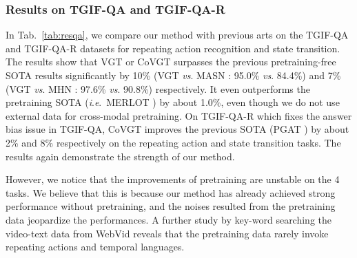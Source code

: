 \documentclass[10pt,journal,compsoc]{IEEEtran}
\newcommand{\vs}{\textit{vs}. }
\newcommand{\ie}{\textit{i}.\textit{e}.}
\begin{document}
\subsubsection{Results on TGIF-QA and TGIF-QA-R}
In Tab.~\ref{tab:resqa}, we compare our method with previous arts on the TGIF-QA \cite{jang2017tgif} and TGIF-QA-R \cite{peng2021progressive} datasets for repeating action recognition and state transition. The results show that VGT or CoVGT surpasses the previous pretraining-free SOTA results significantly by  10\% (VGT \vs MASN \cite{seo2021attend}: 95.0\% \vs 84.4\%) and 7\% (VGT \vs MHN \cite{peng2022multilevel}: 97.6\% \vs 90.8\%) respectively. It even outperforms the pretraining SOTA (\ie~MERLOT \cite{zellers2021merlot}) by about 1.0\%, even though we do not use external data for cross-modal pretraining. On TGIF-QA-R \cite{peng2021progressive} which fixes the answer bias issue in TGIF-QA, CoVGT improves the previous SOTA (PGAT \cite{peng2021progressive}) by about 2\% and 8\% respectively on the repeating action and state transition tasks. The results again demonstrate the strength of our method. 

However, we notice that the improvements of pretraining are unstable on the 4 tasks. We believe that this is because our method has already achieved strong performance without pretraining, and the noises resulted from the pretraining data jeopardize the performances.
A further study by key-word searching the video-text data from WebVid \cite{bain2021frozen} reveals that the pretraining data rarely invoke repeating actions and temporal languages. 
\end{document}
